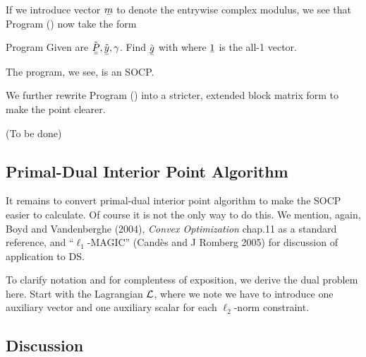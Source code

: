 If we introduce vector \(\V{m}\) to denote the entrywise complex modulus, we see that Program () now take the form

\Result
{Program}
{
   Given are \(\T{\M{P}}, \T{\V{y}}, \gamma\).
Find \(\T{\V{g}}\) with
%
%
where \(\V{1}\) is the all-1 vector.
}

The program, we see, is an SOCP.

We further rewrite Program () into a stricter, extended block matrix form to make the point clearer.

{ \color{red} (To be done) }

\subsection{Primal-Dual Interior Point Algorithm}

It remains to convert primal-dual interior point algorithm to make the SOCP easier to calculate.
Of course it is not the only way to do this.
We mention, again, Boyd and Vandenberghe (2004), \textit{Convex Optimization} chap.11 as a standard reference, and ``\(\ell_1\)-MAGIC'' (Cand\`es and J Romberg 2005) for discussion of application to DS.

To clarify notation and for complentess of exposition, we derive the dual problem here.
Start with the Lagrangian \(\mathcal{L}\), where we note we have to introduce one auxiliary vector and one auxiliary scalar for each \(\ell_2\)-norm constraint.

%
%

\subsection{Discussion}


